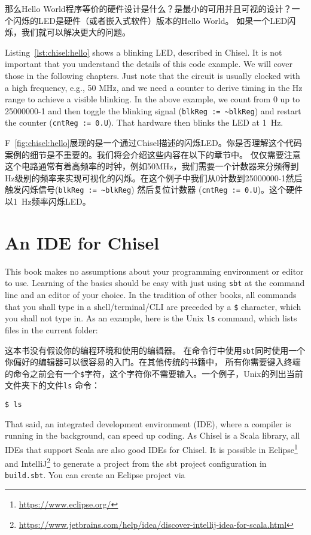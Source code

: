 \documentclass[%
    10pt,
    headinclude, footexclude,
    openright, %
    notitlepage,
    cleardoubleempty,
    headsepline,
    pointlessnumbers,
    bibtotoc, idxtotoc,
    ]{scrbook}
\newcommand{\code}[1]{{\small{\texttt{#1}}}}
\newcommand{\myref}[2]{\href{#1}{#2}}
\renewcommand{\myref}[2]{{#2}{\footnote{\url{#1}}}}
\begin{document}
那么Hello World程序等价的硬件设计是什么？是最小的可用并且可视的设计？一个闪烁的LED是硬件（或者嵌入式软件）版本的Hello World。 
如果一个LED闪烁，我们就可以解决更大的问题。


Listing~\ref{lst:chisel:hello} shows a blinking LED, described in Chisel.
It is not important that you understand the details of this code example.
We will cover those in the following chapters. Just note that the circuit is
usually clocked with a high frequency, e.g., 50 MHz, and we need a counter
to derive timing in the Hz range to achieve a visible blinking. In the above
example, we count from 0 up to 25000000-1 and then toggle the blinking signal
(\code{blkReg := \textasciitilde blkReg}) and restart the counter (\code{cntReg := 0.U}).
That hardware then blinks the LED at 1~Hz.

F~\ref{fig:chisel:hello}展现的是一个通过Chisel描述的闪烁LED。你是否理解这个代码案例的细节是不重要的。我们将会介绍这些内容在以下的章节中。
仅仅需要注意这个电路通常有着高频率的时钟，例如50MHz，我们需要一个计数器来分频得到Hz级别的频率来实现可视化的闪烁。在这个例子中我们从0计数到25000000-1然后触发闪烁信号(\code{blkReg := \textasciitilde blkReg}) 
然后复位计数器 (\code{cntReg := 0.U})。这个硬件以1~Hz频率闪烁LED。

\section{An IDE for Chisel}

This book makes no assumptions about your programming environment or editor to use.
Learning of the basics should be easy with just using \code{sbt} at the command line
and an editor of your choice. In the tradition of other books, all commands that you
shall type in a shell/terminal/CLI are preceded by a \code{\$} character, which you
shall not type in. As an example, here is the Unix \code{ls} command, which lists files in
the current folder:

这本书没有假设你的编程环境和使用的编辑器。
在命令行中使用\code{sbt}同时使用一个你偏好的编辑器可以很容易的入门。在其他传统的书籍中，
所有你需要键入终端的命令之前会有一个\code{\$}字符，这个字符你不需要输入。一个例子，Unix的列出当前文件夹下的文件\code{ls}
命令：

\begin{verbatim}
$ ls
\end{verbatim}

That said, an integrated development environment (IDE), where a compiler is running in
the background, can speed up coding. As Chisel is a Scala library, all IDEs
that support Scala are also good IDEs for Chisel.
It is possible in \myref{https://www.eclipse.org/}{Eclipse} and
\myref{https://www.jetbrains.com/help/idea/discover-intellij-idea-for-scala.html}{IntelliJ}
to generate a project from the sbt project configuration in \code{build.sbt}.
You can create an Eclipse project via
\end{document}

